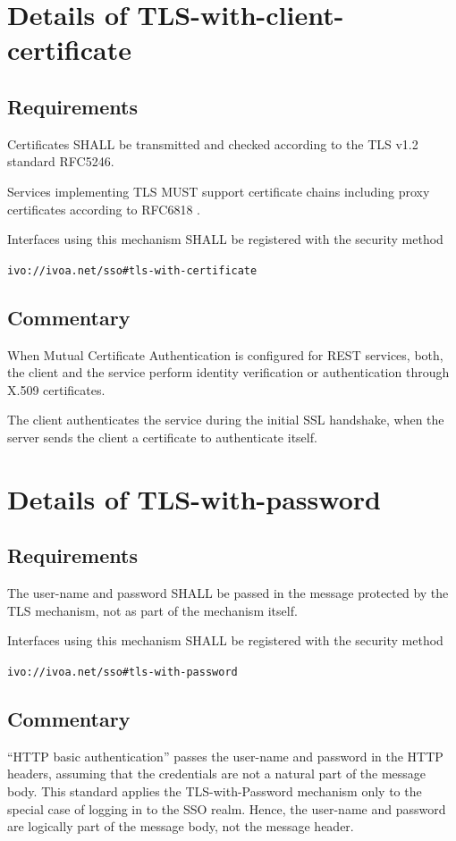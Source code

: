 \documentclass[11pt,a4paper]{ivoa}
\begin{document}
\section{Details of TLS-with-client-certificate}
\subsection{Requirements}
Certificates SHALL be transmitted and checked according to the TLS v1.2 standard RFC5246.

Services implementing TLS MUST support certificate chains including proxy certificates according to RFC6818  \citep{std:RFC6818}.

Interfaces using this mechanism SHALL be  registered with the security method 

\texttt{ivo://ivoa.net/sso\#tls-with-certificate}

\subsection{Commentary}
When Mutual Certificate Authentication is configured for REST services, both, the client and the service perform 
identity verification or authentication through X.509 certificates. 

The client authenticates the service during the initial SSL handshake, when the server sends the client a certificate to authenticate itself.

\section{Details of TLS-with-password}
\subsection{Requirements}
The user-name and password SHALL be passed in the message protected by the TLS mechanism, 
not as part of the mechanism itself. 

Interfaces using this mechanism SHALL  be registered with the security method 

\texttt{ivo://ivoa.net/sso\#tls-with-password}

\subsection{Commentary}
``HTTP basic authentication'' passes the user-name and password in the HTTP headers, 
assuming that the credentials are not a natural part of the message body. 
This standard applies the TLS-with-Password mechanism only to the special case of logging in to the SSO realm. 
Hence, the user-name and password are logically part of the message body, not the message header.
\end{document}
